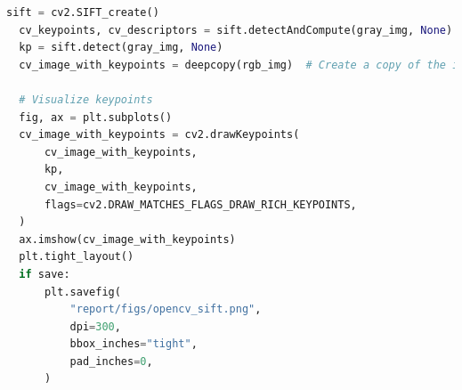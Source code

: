 \documentclass[11pt,a4paper]{article}
\begin{document}
\begin{lstlisting}[language=Python, caption=Comparing with OpenCV]
  sift = cv2.SIFT_create()
  cv_keypoints, cv_descriptors = sift.detectAndCompute(gray_img, None)
  kp = sift.detect(gray_img, None)
  cv_image_with_keypoints = deepcopy(rgb_img)  # Create a copy of the image to draw on

  # Visualize keypoints
  fig, ax = plt.subplots()
  cv_image_with_keypoints = cv2.drawKeypoints(
      cv_image_with_keypoints,
      kp,
      cv_image_with_keypoints,
      flags=cv2.DRAW_MATCHES_FLAGS_DRAW_RICH_KEYPOINTS,
  )
  ax.imshow(cv_image_with_keypoints)
  plt.tight_layout()
  if save:
      plt.savefig(
          "report/figs/opencv_sift.png",
          dpi=300,
          bbox_inches="tight",
          pad_inches=0,
      )
\end{lstlisting}
\end{document}
